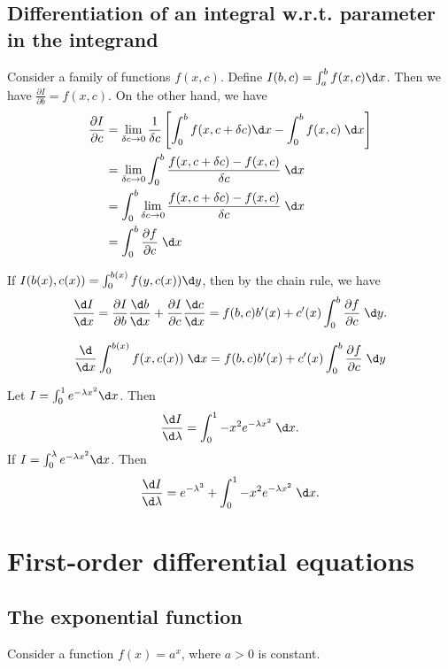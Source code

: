 \documentclass[a4paper]{article}
\begin{document}
  \subsection{Differentiation of an integral w.r.t. parameter in the integrand}
  Consider a family of functions $f(x, c)$. Define $I(b, c) = \int_a^bf(x, c)\d x$. Then we have $\frac{\partial I}{\partial b} = f(x, c)$. On the other hand, we have
  \begin{align*}
    \frac{\partial I}{\partial c} &= \lim_{\delta c\to 0}\frac{1}{\delta c}\left[\int_0^bf(x, c + \delta c)\d x - \int_0^b f(x, c)\;\d x\right]\\
    &= \lim_{\delta c\to 0}\int_0^b\frac{f(x, c + \delta c) - f(x, c)}{\delta c}\;\d x\\
    &= \int_0^b\lim_{\delta c\to 0}\frac{f(x, c + \delta c) - f(x, c)}{\delta c}\;\d x\\
    &= \int_0^b\frac{\partial f}{\partial c}\;\d x
  \end{align*}

  If $I(b(x), c(x)) = \int_0^{b(x)} f(y, c(x))\d y$, then by the chain rule, we have
  \[
    \frac{\d I}{\d x} = \frac{\partial I}{\partial b}\frac{\d b}{\d x} + \frac{\partial I}{\partial c}\frac{\d c}{\d x} = f(b, c)b'(x) + c'(x) \int_0^b\frac{\partial f}{\partial c}\;\d y.
  \]

  \begin{thm}
    \[
      \frac{\d}{\d x} \int_{0}^{b(x)} f(x, c(x))\;\d x= f(b, c)b'(x) + c'(x)\int_0^b \frac{\partial f}{\partial c}\;\d y
    \]
  \end{thm}
  \begin{eg}
    Let $I = \int_0^1 e^{-\lambda x^2}\d x$. Then
    \[
      \frac{\d I}{\d \lambda} = \int_0^1-x^2e^{-\lambda x^2}\;\d x.
    \]
    If $I = \int_0^\lambda e^{-\lambda x^2}\d x$. Then
    \[
      \frac{\d I}{\d \lambda} = e^{-\lambda^3} + \int_0^1-x^2e^{-\lambda x^2}\;\d x.
    \]
  \end{eg}

  \section{First-order differential equations}
  \subsection{The exponential function}
  Consider a function $f(x) = a^x$, where $a>0$ is constant. 
\end{document}
